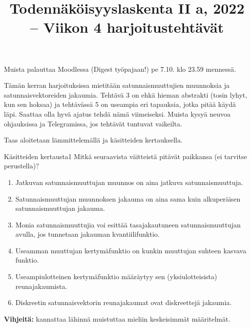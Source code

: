 \documentclass[11pt,a4paper]{amsart}
\title{Todennäköisyyslaskenta II a, 2022 -- Viikon 4 harjoitustehtävät}
\newcommand{\1}{\mathbf{1}}
\begin{document}
\maketitle

Muista palauttaa Moodlessa (Digest työpajaan!) pe 7.10. klo 23.59 mennessä.

\medskip 

Tämän kerran harjoituksissa mietitään satunnaismuuttujien muunnoksia ja satunnaisvektoreiden jakaumia. Tehtävä 3 on ehkä hieman abstrakti (tosin lyhyt, kun sen hoksaa) ja tehtävässä 5 on useampia eri tapauksia, jotka pitää käydä läpi. Saattaa olla hyvä ajatus tehdä nämä viimeiseksi. Muista kysyä neuvoa ohjauksissa ja Telegramissa, jos tehtävät tuntuvat vaikeilta.

\medskip 

Taas aloitetaan lämmittelemällä ja käsitteiden kertauksella. 
\begin{Exercises}{Käsitteiden kertausta}{1}
Mitkä seuraavista väitteistä pitävät paikkansa (ei tarvitse perustella)? 
\begin{enumerate}
\item  Jatkuvan satunnaismuuttujan muunnos on aina jatkuva satunnaismuuttuja.

\item Satunnaismuuttujan muunnoksen jakauma on aina sama kuin alkuperäisen satunnaismuuttujan jakauma.

\item Monia satunnaismuuttujia voi esittää tasajakautuneen satunnaismuuttujan avulla, jos tunnetaan jakauman kvantiilifunktio.


\item Useamman muuttujan kertymäfunktio on kunkin muuttujan suhteen kasvava funktio.


\item Useampiulotteinen kertymäfunktio määräytyy sen (yksiulotteisista) reunajakaumista.


\item Diskreetin satunnaisvektorin reunajakaumat ovat diskreettejä jakaumia.


\end{enumerate}
{\bf Vihjeitä:} kannattaa lähinnä muistuttaa mieliin keskeisimmät määritelmät. 
\end{Exercises}
\end{document}
